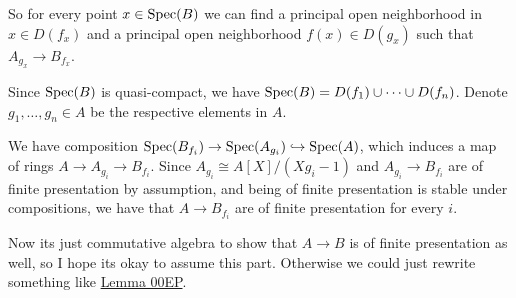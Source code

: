 \begin{exercise}{4}
\begin{enumerate}
{                So for every point $x \in \operatorname{Spec}(B)$ we can find a principal open
                neighborhood in $x \in D(f_x)$ and a principal open
                neighborhood $f(x) \in D(g_x)$ such that $A_{g_x} \to B_{f_x}$.

                Since $\operatorname{Spec}(B)$ is quasi-compact, we have $\operatorname{Spec}(B) = D(f_1)
                \cup \dots \cup D(f_n)$. Denote $g_1, \dots, g_n \in A$ be the
                respective elements in $A$.

                We have composition $\operatorname{Spec}(B_{f_i}) \to \operatorname{Spec}(A_{g_i}) \hookrightarrow
                \operatorname{Spec}(A)$, which induces a map of rings $A \to A_{g_i} \to B_{f_i}$.
                Since $A_{g_i} \cong A[X]/(X g_i - 1)$ and $A_{g_i} \to B_{f_i}$
                are of finite presentation by assumption, and being of
                finite presentation is stable under compositions, we have that
                $A \to B_{f_i}$ are of finite presentation for every $i$.

                Now its just commutative algebra to show that $A \to B$ is of
                finite presentation as well, so I hope its okay to assume this
                part. Otherwise we could just rewrite something like
                \href{https://stacks.math.columbia.edu/tag/00EP}{Lemma 00EP}.

            }
    \end{enumerate}
\end{exercise}


